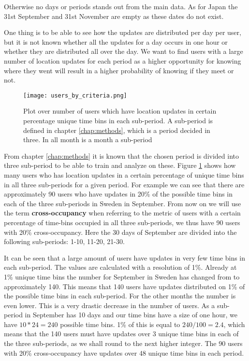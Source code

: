 Otherwise no days or periods stands out from the main data. As for Japan the 31st September and 31st November are empty as these dates do not exist.  

One thing is to be able to see how the updates are distributed per day per user, but it is not known whether all the updates for a day occurs in one hour or whether they are distributed all over the day. We want to find users with a large number of location updates for each period as a higher opportunity for knowing where they went will result in a higher probability of knowing if they meet or not.  


\begin{figure}[H]
    \hspace*{-2.0cm}
    \centering
    \texttt{[image: users\_by\_criteria.png]}
    \caption{Plot over number of users which have location updates in certain percentage unique time bins in each sub-period. A sub-period is defined in chapter \ref{chap:methods}, which is a period decided in three. In all month is a month a sub-period}
    \label{fig:users_by_criteria}
\end{figure}
From chapter \ref{chap:methods} it is known that the chosen period is divided into three sub-period to be able to train and analyze on these. Figure \ref{fig:users_by_criteria} shows how many users who has location updates in a certain percentage of unique time bins in all three sub-periods for a given period. For example we can see that there are approximately 90 users who have updates in 20\% of the possible time bins in each of the three sub-periods in Sweden in September. From now on we will use the term \textbf{cross-occupancy} when referring to the metric of users with a certain percentage of time-bins occupied in all three sub-periods, we thus have 90 users with 20\% cross-occupancy. Here the 30 days of September are divided into the following sub-periods: 1-10, 11-20, 21-30. 

It can be seen that a large amount of users have updates in very few time bins in each sub-period. The values are calculated with a resolution of 1\%. Already at 1\% unique time bins the number for September in Sweden has changed from \numberUsersSweden{} to approximately 140. This means that 140 users have updates distributed on 1\% of the possible time bins in each sub-period. For the other months the number is even lower. This is a very drastic decrease in the number of users. 
As a sub-period in September has 10 days and our time bins have a size of one hour, we have $10*24=240$ possible time bins. 1\% of this is equal to $240/100=2.4$, which means that the 140 users must have updates over 3 unique time bins in each of the three sub-periods, as we shall round to the next higher integer. 
The 90 users with 20\% cross-occupancy have updates over 48 unique time bins in each period. 


